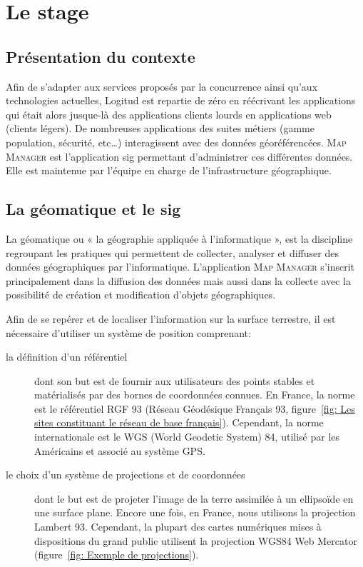\documentclass{rapportUHA40}
\begin{document}
\section{Le stage}
\subsection{Présentation du contexte}

Afin de s'adapter aux services proposés par la concurrence ainsi qu'aux
technologies actuelles, Logitud est repartie de zéro en réécrivant les
applications qui était alors jusque-là des applications clients lourds en
applications web (clients légers). De nombreuses applications des suites
métiers (gamme population, sécurité, etc\ldots) interagissent avec des données
géoréférencées. \textsc{Map Manager} est l'application \gls{sig} permettant
d’administrer ces différentes données. Elle est maintenue par l’équipe en
charge de l’infrastructure géographique.

\subsection{La géomatique et le \gls{sig}}
La géomatique ou « la géographie appliquée à l'informatique », est la
discipline regroupant les pratiques qui permettent de collecter, analyser et
diffuser des données géographiques par l'informatique. L'application
\textsc{Map Manager} s'inscrit principalement dans la diffusion des données
mais aussi dans la collecte avec la possibilité de création et modification
d'objets géographiques.

Afin de se repérer et de localiser l'information sur la surface terrestre, il
est nécessaire d'utiliser un système de position comprenant:
\begin{description}
  \item[la définition d'un référentiel] dont son but est de fournir aux utilisateurs
    des points stables et matérialisés par des bornes de coordonnées connues. En
    France, la norme est le référentiel RGF 93 (Réseau Géodésique Français 93,
    figure~\ref{fig: Les sites constituant le réseau de base français}). Cependant,
    la norme internationale est le WGS (World Geodetic System) 84, utilisé par les
    Américains et associé au système GPS\@.

  \item[le choix d'un système de projections et de coordonnées] dont le but est de
    projeter l'image de la terre assimilée à un ellipsoïde en une surface plane.
    Encore une fois, en France, nous utilisons la projection Lambert 93. Cependant,
    la plupart des cartes numériques mises à dispositions du grand public utilisent
    la projection WGS84 Web Mercator (figure~\ref{fig: Exemple de projections}).
\end{description}
\end{document}
